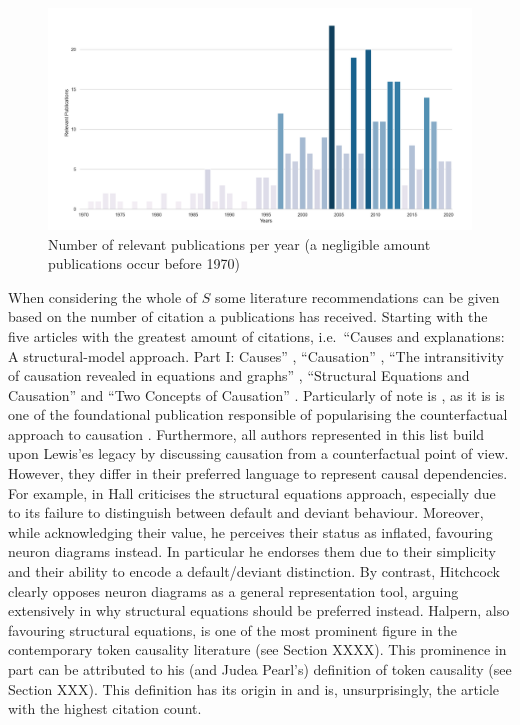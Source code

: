 \documentclass[11pt,a4paper]{book}
\theoremstyle{definition}
\theoremstyle{definition}
\theoremstyle{definition}
\theoremstyle{remark}
\newcommand{\pset}{S}
\begin{document}
\begin{figure}[h]
\includegraphics[width=\textwidth]{relevant_publications_per_year.png}
\caption{Number of relevant publications per year (a negligible amount publications occur before 1970)}
\label{fig:pgraph-relevant_publications_per_year}
\end{figure}


When considering the whole of $\pset$ some literature recommendations can be given based on the number of citation a publications has received. 
Starting with the five articles with the greatest amount of citations, i.e.\ 
``Causes and explanations: A structural-model approach. Part I: Causes'' \parencite{halpern2005causes}, 
``Causation'' \parencite{lewis1974causation},
``The intransitivity of causation revealed in equations and graphs'' \parencite{hitchcock2001intransitivity}, 
``Structural Equations and Causation'' \parencite{hall2007structural} and 
``Two Concepts of Causation'' \parencite{hall2004two}.
Particularly of note is \parencite{lewis1974causation}, as it is is one of the foundational publication responsible of popularising the counterfactual approach to causation \parencite{beebee2009oxford}.
Furthermore, all authors represented in this list build upon Lewis'es legacy by discussing causation from a counterfactual point of view. 
However, they differ in their preferred language to represent causal dependencies. For example, in \parencite{hall2007structural} Hall criticises the structural equations approach, especially due to its failure to distinguish between default and deviant behaviour. Moreover, while acknowledging their value, he perceives their status as inflated, favouring neuron diagrams instead. In particular he endorses them due to their simplicity and their ability to encode a default/deviant distinction. By contrast, Hitchcock clearly opposes neuron diagrams as a general representation tool, arguing extensively in \parencite{hitchcock2007s} why structural equations should be preferred instead.
Halpern, also favouring structural equations, is one of the most prominent figure in the contemporary token causality literature (see Section XXXX). This prominence in part can be attributed to his (and Judea Pearl's) definition of token causality (see Section XXX). This definition has its origin in \parencite{halpern2005causes} and is, unsurprisingly, the article with the highest citation count.
\end{document}
